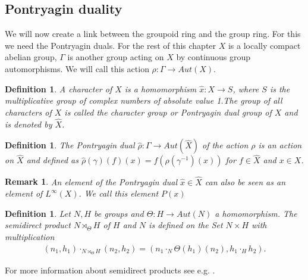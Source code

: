 \documentclass[12pt,a4paper]{scrartcl}
\newtheorem{Definition}[Theorem]{Definition}
\newtheorem{Remark}[Theorem]{Remark}
\numberwithin{equation}{section}
\newcommand{\2}{\mathbb{Z} / 2 \mathbb{Z}}
\newcommand{\1}{\overline{1}}
\newcommand{\0}{\overline{0}}
\begin{document}
\subsection{Pontryagin duality}
We will now create a link between the groupoid ring and the group ring. For this we need the Pontryagin duals. For the rest of this chapter $X$ is a locally compact abelian group, $\Gamma$ is another group acting on $X$ by continuous group automorphisms. We will call this action $\rho: \Gamma \to Aut(X)$.
\begin{Definition}
	A character of $X$ is a homomorphism $\hat{x}: X \to S$, where $S$ is the multiplicative group of complex numbers of absolute value 1.The group of all characters of $X$ is called the character group or Pontryagin dual group of $X$ and is denoted by $\hat{X}$.
\end{Definition}
\begin{Definition}
	The Pontryagin dual $\hat{\rho}:\Gamma \to Aut(\hat{X})$ of the action $\rho$ is an action on $\hat{X}$ and defined as $\hat{\rho}(\gamma)(f)(x) = f(\rho(\gamma^{-1})(x))$ for $f \in \hat{X}$ and $x \in X$.
\end{Definition}
\begin{Remark}
	An element of the Pontryagin dual $\hat{x} \in \hat{X}$ can also be seen as an element of $L^{\infty}(X)$. We call this element $P(x)$
\end{Remark}
\begin{Definition}
	Let $N, H$ be groups and $\Theta : H \to Aut(N)$ a homomorphism. The semidirect product $N \rtimes_\Theta H$ of $H$ and $N$ is defined on the Set $N \times H$ with multiplication 
	\begin{align*}
		(n_1, h_1) \cdot_{N \rtimes_\Theta H} (n_2, h_2) = (n_1 \cdot_N \Theta(h_1)(n_2), h_1 \cdot_H h_2).
	\end{align*}
\end{Definition}
For more information about semidirect products see e.g. \cite{ALG}.
\end{document}

